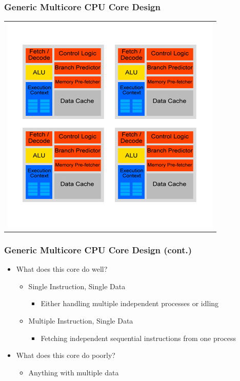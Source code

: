 \documentclass{beamer}
\begin{document}
\begin{frame}
	\frametitle{Generic Multicore CPU Core Design}
	\begin{tabular}{c}
		\includegraphics[width=.75\textwidth]{Multicore-CPU-design.jpg}
	\end{tabular}
\end{frame}

\begin{frame}
	\frametitle{Generic Multicore CPU Core Design (cont.)}
	\begin{itemize}
		\item What does this core do well?
		\begin{itemize}
			\item Single Instruction, Single Data
			\begin{itemize}
				\item Either handling multiple independent processes or idling
			\end{itemize}
			\item Multiple Instruction, Single Data
			\begin{itemize}
				\item Fetching independent sequential instructions from one process
			\end{itemize}
		\end{itemize}
		\item What does this core do poorly?
		\begin{itemize}
			\item Anything with multiple data
		\end{itemize}
	\end{itemize}
\end{frame}
\end{document}
